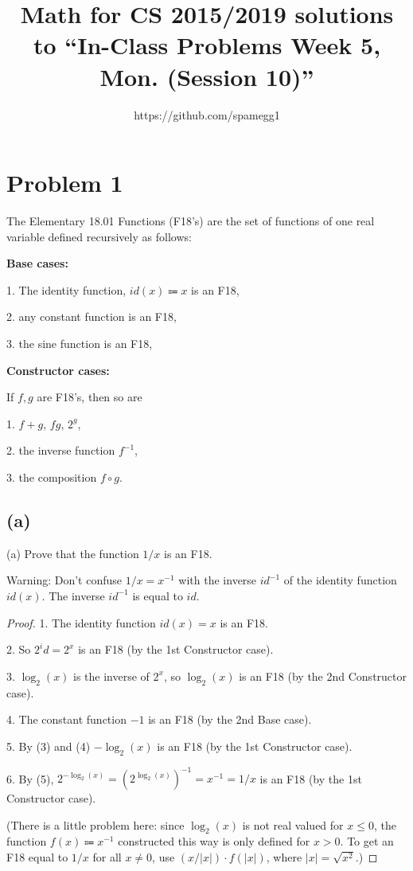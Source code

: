 \documentclass[14pt]{extarticle}
\title{Math for CS 2015/2019 solutions to ``In-Class Problems Week 5, Mon. (Session 10)''}
\author{https://github.com/spamegg1}
\begin{document}
\maketitle
\tableofcontents

\section{Problem 1}
The Elementary 18.01 Functions (F18’s) are the set of functions of one real variable defined recursively as follows:

{\bf Base cases:}

1. The identity function, $id(x) \Coloneqq x$ is an F18,

2. any constant function is an F18,

3. the sine function is an F18,

{\bf Constructor cases:}

If $f, g$ are F18’s, then so are

1. $f + g$, $fg$, $2^g$,

2. the inverse function $f^{-1}$,

3. the composition $f \circ g$.

\subsection{(a)}
(a) Prove that the function $1/x$ is an F18.

Warning: Don’t confuse $1/x = x^{-1}$ with the inverse $id^{-1}$ of the identity function $id(x)$. The inverse $id^{-1}$ is equal to $id$.
\begin{proof}
1. The identity function $id(x) = x$ is an F18.

2. So $2^id = 2^x$ is an F18 (by the 1st Constructor case).

3. $\log_2(x)$ is the inverse of $2^x$, so $\log_2(x)$ is an F18 (by the 2nd Constructor case).

4. The constant function $-1$ is an F18 (by the 2nd Base case).

5. By (3) and (4) $-\log_2(x)$ is an F18 (by the 1st Constructor case).

6. By (5), $2^{-\log_2(x)} = (2^{\log_2(x)})^{-1} = x^{-1} = 1/x$ is an F18 (by the 1st Constructor case).

(There is a little problem here: since $\log_2(x)$ is not real valued for $x \leq 0$, the function $f(x) \Coloneqq x^{-1}$ constructed this way is only defined for $x > 0$. To get an F18 equal to $1/x$ for all $x \neq 0$, use $(x / |x|) \cdot f(|x|)$, where $|x| = \sqrt{x^2}$.)
\end{proof}
\end{document}
